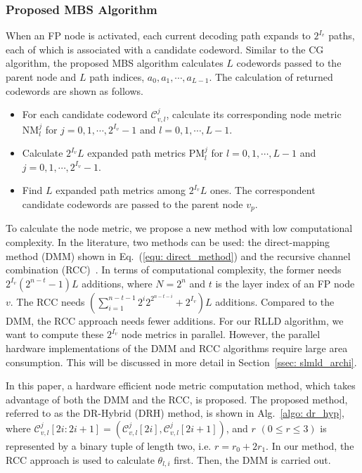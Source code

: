 \documentclass[journal]{IEEEtran}
\begin{document}
\subsubsection{Proposed MBS Algorithm} \label{ssec: mld}



When an FP node is activated, each current decoding path expands to $2^{I_v}$ paths, each of which is associated with a candidate codeword. Similar to the CG algorithm, the proposed MBS algorithm calculates $L$ codewords passed to the parent node and $L$ path indices, $a_0, a_1,\cdots,a_{L-1}$. The calculation of returned codewords are shown as follows.
\begin{itemize}
\item For each candidate codeword $\mathcal{C}_{v,l}^j$,  calculate its corresponding node metric NM$_l^j$ for $j=0,1,\cdots,2^{I_v}-1$ and $l=0,1,\cdots,L-1$.
\item Calculate $2^{I_v}L$ expanded path metrics PM$_l^{j}$ for $l=0,1,\cdots,L-1$ and $j=0,1,\cdots,2^{I_v}-1$.
\item Find $L$ expanded path metrics among $2^{I_v}L$ ones. The correspondent candidate codewords are passed to the parent node $v_p$.
\end{itemize}


To calculate the node metric, we propose a new method with low computational complexity. In the literature, two methods can be used: the direct-mapping method (DMM) shown in Eq.~(\ref{equ: direct_method}) and the recursive channel
combination (RCC)~\cite{chenrong_tsp}. In terms of computational
complexity, the former needs $2^{I_v}(2^{n-t}-1)L$ additions,
where $N=2^n$ and $t$ is the layer index
of an FP node $v$. The RCC needs $(\sum_{i=1}^{n-t-1}2^i2^{2^{n-t-i}}+2^{I_v})L$ additions.
Compared to the DMM, the RCC approach needs fewer additions. For our RLLD algorithm, we want to compute these $2^{I_v}$ node metrics in parallel. However, the parallel hardware implementations of the DMM and RCC algorithms require large area consumption. This will be discussed in more detail in Section~\ref{ssec: slmld_archi}.

In this paper, a hardware efficient node metric computation method, which takes advantage of both the
DMM and the RCC, is proposed. The proposed method, referred to as the DR-Hybrid (DRH) method, is shown in
Alg.~\ref{algo: dr_hyp}, where $\mathcal{C}_{v,l}^j[2i:2i+1] =
(\mathcal{C}_{v,l}^j[2i],\mathcal{C}_{v,l}^j[2i+1])$, and $r$ $(0\leqslant r \leqslant 3)$ is represented by a binary tuple of length two, i.e. $r = r_0+2r_1$. In
our method, the RCC approach is used to calculate $\theta_{l,i}$ first. Then,
the DMM is carried out.
\end{document}
